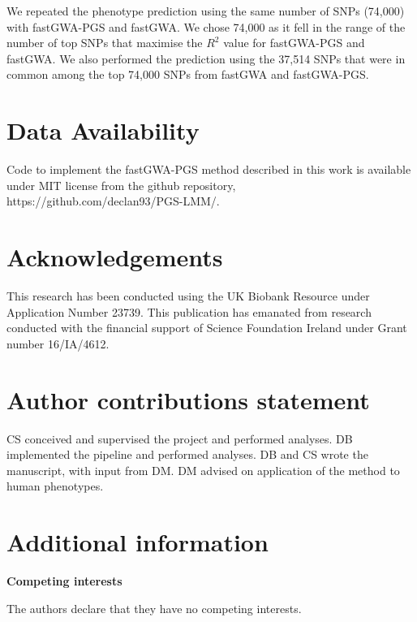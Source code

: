 \documentclass[fleqn,10pt]{wlscirep}
\begin{document}
We repeated the phenotype prediction using the same number of SNPs (74,000) with fastGWA-PGS and fastGWA. We chose 74,000 as it fell in the range of the number of top SNPs that maximise the $R^2$ value for fastGWA-PGS and fastGWA. We also performed the prediction using the 37,514 SNPs that were in common among the top 74,000 SNPs from fastGWA and fastGWA-PGS.

\section*{Data Availability}
Code to implement the fastGWA-PGS method described in this work is available under MIT license from the github repository, https://github.com/declan93/PGS-LMM/.
\par\par 


\section*{Acknowledgements}

This research has been conducted using the UK Biobank Resource under Application Number 23739. This publication has emanated from research conducted with the financial support of Science Foundation Ireland under Grant number 16/IA/4612.

\section*{Author contributions statement}

CS conceived and supervised the project and performed analyses. DB implemented the pipeline and performed analyses. DB and CS wrote the manuscript, with input from DM. DM advised on application of the method to human phenotypes.

\section*{Additional information}
\textbf{Competing interests} \par The authors declare that they have no competing interests. 
\end{document}

